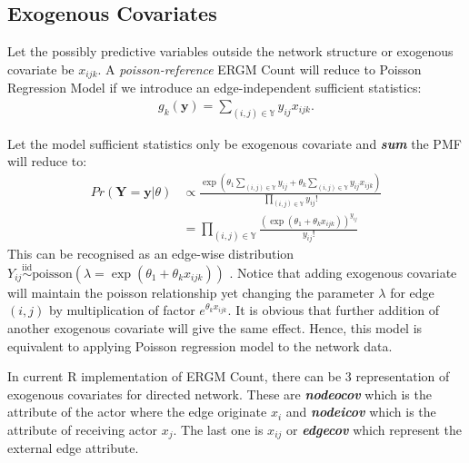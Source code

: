 \documentclass[12pt,a4paper,twoside,openany]{book}\usepackage[]{graphicx}\usepackage[]{color}
\newcommand{\BI}[1]{\textit{\textbf{#1}}}
\begin{document}
\subsection{Exogenous Covariates}
Let the possibly predictive variables outside the network structure or exogenous covariate be $x_{ijk}$.
A \textit{poisson-reference} ERGM Count will reduce to Poisson Regression Model if we introduce an edge-independent sufficient statistics:
\begin{align}
g_k(\bm{y})= \sum_{(i,j) \in \mathbb{Y}} y_{ij}x_{ijk}.
\end{align}

Let the model sufficient statistics only be exogenous covariate and \BI{sum}  the PMF will reduce to:
\begin{align*}
Pr(\bm{Y}=\bm{y}|\theta) &\propto \frac{\exp\left(\theta_1 \sum_{(i,j) \in \mathbb{Y}} y_{ij} + \theta_k \sum_{(i,j) \in \mathbb{Y}} y_{ij}x_{ijk} \right)}{\prod_{(i,j) \in \mathbb{Y}}y_{ij}!} \\
&= \prod_{(i,j) \in \mathbb{Y}} \frac{(\exp(\theta_1+\theta_k x_{ijk}))^{y_{ij}}}{y_{ij}!}
\end{align*}
This can be recognised as an edge-wise distribution $Y_{ij}\stackrel{\text{iid}}{\sim}\text{poisson}(\lambda =\exp(\theta_1 + \theta_k x_{ijk}))$ .
Notice that adding exogenous covariate will maintain the poisson relationship yet changing the parameter $\lambda$ for edge $(i,j)$ by multiplication of factor $e^{\theta_k x_{ijk}}$.
It is obvious that further addition of another exogenous covariate will give the same effect.
Hence, this model is equivalent to applying Poisson regression model to the network data.  

In current R implementation of ERGM Count, there can be 3 representation of exogenous covariates for directed network. 
These are \BI{nodeocov} which is the attribute of the actor where the edge originate $x_{i}$ and \BI{nodeicov} which is the attribute of receiving actor $x_j$. 
The last one is $x_{ij}$ or \BI{edgecov} which represent the external edge attribute.
\end{document}
